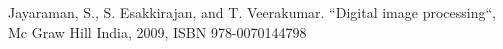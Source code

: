 \documentclass[conference]{IEEEtran}
\begin{document}
\begin{thebibliography}{00}
Jayaraman, S., S. Esakkirajan, and T. Veerakumar. ``Digital image processing``, Mc Graw Hill India, 2009, ISBN 978-0070144798

%
%
%
%
%
%
%
%
%
%

\end{thebibliography}
\end{document}
